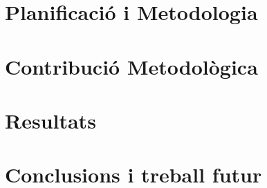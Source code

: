 \documentclass[a4paper,12pt,twoside]{ThesisStyle}
\begin{document}
\chapter{Planificació i Metodologia}
\label{cap:plan}

\chapter{Contribució Metodològica}
\label{cap:contrib}

\chapter{Resultats}
\label{cap:result}

\chapter{Conclusions i treball futur}
\label{cap:concl}

\backmatter


%




\end{document}
